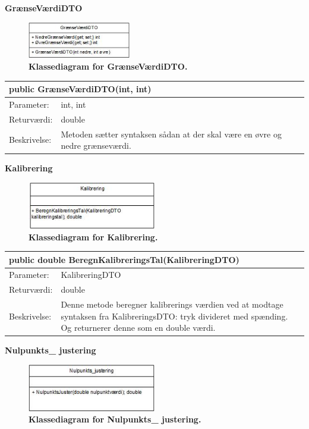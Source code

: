 \textbf{GrænseVærdiDTO}
\begin{figure}[H]
\includegraphics[width =0.4\textwidth , center]{billeder/klassediagramgransevardiDTO}
\caption{\textbf{Klassediagram for GrænseVærdiDTO.}}
\end{figure}
\begin{table}[H]
\label{tab:tabel2}
\begin{tabular}{| l | p{13cm} |}
   \hline
   \multicolumn{2}{|l|}{public GrænseVærdiDTO(int, int)} \\ \hline
   Parameter: & int, int\\ \hline
   Returværdi: & double \\ \hline
   Beskrivelse: & Metoden sætter syntaksen sådan at der skal være en øvre og nedre grænseværdi.\\ \hline
\end{tabular}
\end{table}
\textbf{Kalibrering}
\begin{figure}[H]
\includegraphics[width =0.5\textwidth , center]{billeder/klassediagramkalibrering}
\caption{\textbf{Klassediagram for Kalibrering.}}
\end{figure}
\begin{table}[H]
\label{tab:tabel2}
\begin{tabular}{| l | p{13cm} |}
   \hline
   \multicolumn{2}{|l|}{public double BeregnKalibreringsTal(KalibreringDTO)} \\ \hline
   Parameter: & KalibreringDTO\\ \hline
   Returværdi: & double \\ \hline
   Beskrivelse: & Denne metode beregner kalibrerings værdien ved at modtage syntaksen fra KalibreringsDTO: tryk divideret med spænding. Og returnerer denne som en double værdi.\\ \hline
\end{tabular}
\end{table}
\textbf{Nulpunkts\_ justering}
\begin{figure}[H]
\includegraphics[width =0.5\textwidth , center]{billeder/klassediagramnulpunkt}
\caption{\textbf{Klassediagram for Nulpunkts\_ justering.}}
\end{figure}

